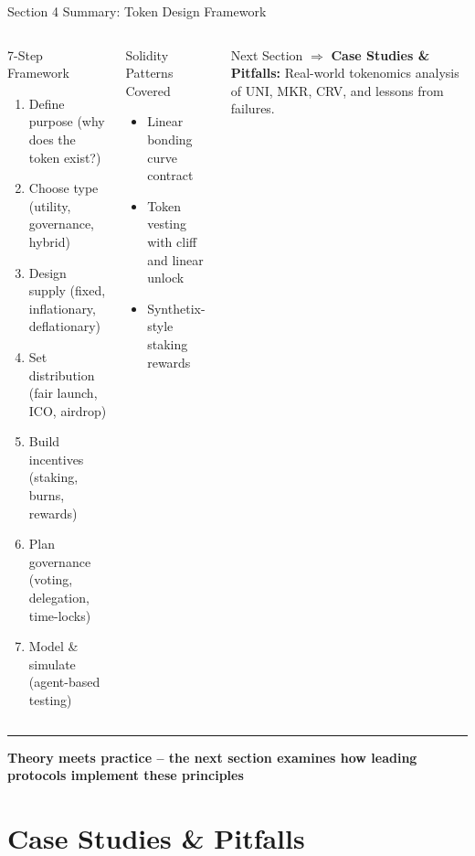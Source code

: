 \documentclass[8pt,aspectratio=169]{beamer}
\newcommand{\bottomnote}[1]{\vfill\vspace{-2mm}\textcolor{mllavender2}{\rule{\textwidth}{0.4pt}}\vspace{1mm}\footnotesize\textbf{#1}}
\begin{document}
\begin{frame}{Section 4 Summary: Token Design Framework}
\begin{columns}[T]
\begin{block}{7-Step Framework}
\footnotesize
\begin{enumerate}
  \item Define purpose (why does the token exist?)
  \item Choose type (utility, governance, hybrid)
  \item Design supply (fixed, inflationary, deflationary)
  \item Set distribution (fair launch, ICO, airdrop)
  \item Build incentives (staking, burns, rewards)
  \item Plan governance (voting, delegation, time-locks)
  \item Model \& simulate (agent-based testing)
\end{enumerate}
\end{block}

\begin{block}{Solidity Patterns Covered}
\footnotesize
\begin{itemize}
  \item Linear bonding curve contract
  \item Token vesting with cliff and linear unlock
  \item Synthetix-style staking rewards
\end{itemize}
\end{block}
\vspace{2mm}
\begin{exampleblock}{\footnotesize Next Section}
\footnotesize
$\Rightarrow$ \textbf{Case Studies \& Pitfalls:} Real-world tokenomics analysis of UNI, MKR, CRV, and lessons from failures.
\end{exampleblock}
\end{columns}
\bottomnote{Theory meets practice -- the next section examines how leading protocols implement these principles}
\end{frame}

\section{Case Studies \& Pitfalls}
\end{document}
